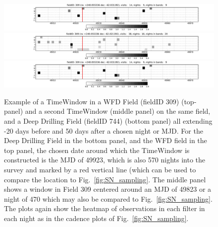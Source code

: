 \begin{center}
\begin{figure}
 \includegraphics[width=\textwidth]{figs/supernova/TimeWindow_309_49923.pdf}
 \includegraphics[width=\textwidth]{figs/supernova/TimeWindow_309_49823.pdf}
 \includegraphics[width=\textwidth]{figs/supernova/TimeWindow_744_49923.pdf}
 \label{fig:TimeWindow}
 \caption{Example of a TimeWindow in a WFD Field (fieldID 309) (top-panel) and a second TimeWindow (middle panel) on the same field, and a Deep Drilling Field (fieldID 744) (bottom panel) all extending -20 days before and 50 days after a chosen night or MJD. For the Deep Drilling Field in the bottom panel, and the WFD field in the top  panel, the chosen date around which the TimeWindow is constructed is the MJD of 49923, which is also 570 nights into the survey and marked by a red vertical line (which can be used to compare the location to Fig.~\ref{fig:SN_sampling}. The middle panel shows a window in Field 309 centered around an MJD of 49823 or a night of 470 which may also be compared to Fig.~\ref{fig:SN_sampling}. The plots again show the heatmap of observations in each filter in each night as in the cadence plots of Fig.~\ref{fig:SN_sampling}.}
\end{figure}
 \end{center}


